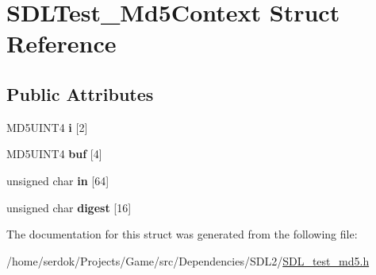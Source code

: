 \hypertarget{structSDLTest__Md5Context}{}\section{S\+D\+L\+Test\+\_\+\+Md5\+Context Struct Reference}
\label{structSDLTest__Md5Context}
\subsection*{Public Attributes}
\begin{DoxyCompactItemize}
\item 
\mbox{\label{structSDLTest__Md5Context_a95b3d5fd74fd1b7a27bf96f3bb32beb4}} 
M\+D5\+U\+I\+N\+T4 {\bfseries i} \mbox{[}2\mbox{]}
\item 
\mbox{\label{structSDLTest__Md5Context_a061f0cead7ec49ac4c5baf0bbd9c13a7}} 
M\+D5\+U\+I\+N\+T4 {\bfseries buf} \mbox{[}4\mbox{]}
\item 
\mbox{\label{structSDLTest__Md5Context_a337638ef799dc0ad9397ea9b175ea388}} 
unsigned char {\bfseries in} \mbox{[}64\mbox{]}
\item 
\mbox{\label{structSDLTest__Md5Context_ab29079997a9f35e5d52c2aac3ad28f90}} 
unsigned char {\bfseries digest} \mbox{[}16\mbox{]}
\end{DoxyCompactItemize}


The documentation for this struct was generated from the following file\+:\begin{DoxyCompactItemize}
\item 
/home/serdok/\+Projects/\+Game/src/\+Dependencies/\+S\+D\+L2/\hyperlink{SDL__test__md5_8h}{S\+D\+L\+\_\+test\+\_\+md5.\+h}\end{DoxyCompactItemize}
